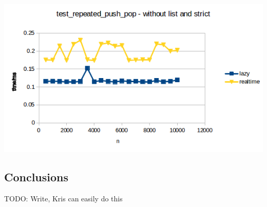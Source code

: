 \includegraphics{Graphs/test_repeated_push_pop_without_list.png}


\subsection{Conclusions}
 
 TODO: Write, Kris can easily do this
